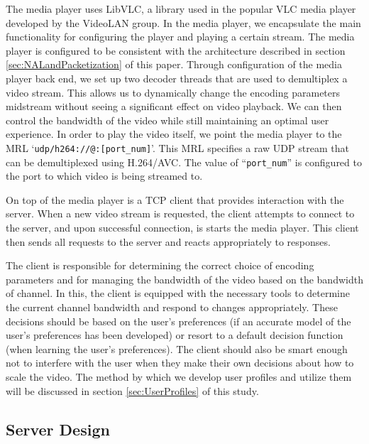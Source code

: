\documentclass[preprint, 12pt]{elsarticle}
\begin{document}
The media player uses LibVLC, a library used in the popular VLC media player developed by the VideoLAN group. In the media player, we encapsulate the main functionality for configuring the player and playing a certain stream.  The media player is configured to be consistent with the architecture described in section \ref{sec:NALandPacketization} of this paper. Through configuration of the media player back end, we set up two decoder threads that are used to demultiplex a video stream. This allows us to dynamically change the encoding parameters midstream without seeing a significant effect on video playback. We can then control the bandwidth of the video while still maintaining an optimal user experience. In order to play the video itself, we point the media player to the MRL `\verb=udp/h264://@:[port_num]='. This MRL specifies a raw UDP stream that can be demultiplexed using H.264/AVC. The value of ``\verb=port_num=''  is configured to the port to which video is being streamed to.

On top of the media player is a TCP client that provides interaction with the server. When a new video stream is requested, the client attempts to connect to the server, and upon successful connection, is starts the media player. This client then sends all requests to the server and reacts appropriately to responses.

The client is responsible for determining the correct choice of encoding parameters and for managing the bandwidth of the video based on the bandwidth of channel. In this, the client is equipped with the necessary tools to determine the current channel bandwidth and respond to changes appropriately. These decisions should be based on the user's preferences (if an accurate model of the user’s preferences has been developed) or resort to a default decision function (when learning the user’s preferences). The client should also be smart enough not to interfere with the user when they make their own decisions about how to scale the video. The method by which we develop user profiles and utilize them will be discussed in section \ref{sec:UserProfiles} of this study.

\subsection{Server Design}
\end{document}
